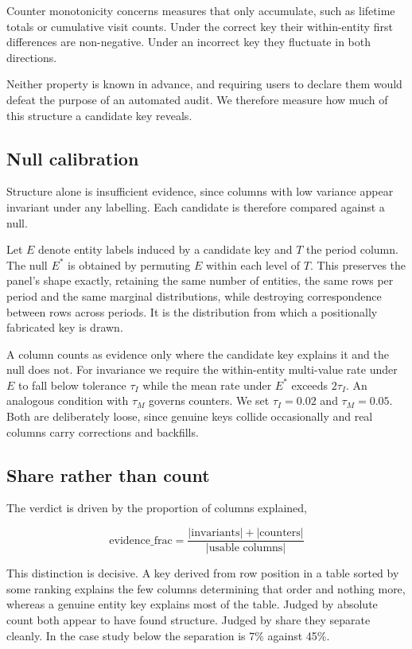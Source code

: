 \documentclass[preprint,12pt]{elsarticle}
\begin{document}
Counter monotonicity concerns measures that only accumulate, such as lifetime
totals or cumulative visit counts. Under the correct key their within-entity
first differences are non-negative. Under an incorrect key they fluctuate in
both directions.

Neither property is known in advance, and requiring users to declare them would
defeat the purpose of an automated audit. We therefore measure how much of this
structure a candidate key reveals.

\subsection{Null calibration}

Structure alone is insufficient evidence, since columns with low variance appear
invariant under any labelling. Each candidate is therefore compared against a
null.

Let $E$ denote entity labels induced by a candidate key and $T$ the period
column. The null $E^{*}$ is obtained by permuting $E$ within each level of $T$.
This preserves the panel's shape exactly, retaining the same number of entities,
the same rows per period and the same marginal distributions, while destroying
correspondence between rows across periods. It is the distribution from which a
positionally fabricated key is drawn.

A column counts as evidence only where the candidate key explains it and the
null does not. For invariance we require the within-entity multi-value rate
under $E$ to fall below tolerance $\tau_{I}$ while the mean rate under $E^{*}$
exceeds $2\tau_{I}$. An analogous condition with $\tau_{M}$ governs counters. We
set $\tau_{I} = 0.02$ and $\tau_{M} = 0.05$. Both are deliberately loose, since
genuine keys collide occasionally and real columns carry corrections and
backfills.

\subsection{Share rather than count}

The verdict is driven by the proportion of columns explained,

\begin{equation}
\text{evidence\_frac} =
\frac{|\text{invariants}| + |\text{counters}|}{|\text{usable columns}|}
\end{equation}

This distinction is decisive. A key derived from row position in a table sorted
by some ranking explains the few columns determining that order and nothing
more, whereas a genuine entity key explains most of the table. Judged by
absolute count both appear to have found structure. Judged by share they
separate cleanly. In the case study below the separation is 7\% against 45\%.
\end{document}
